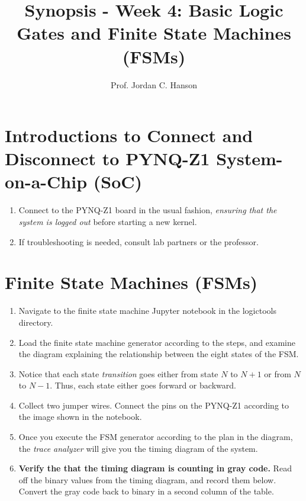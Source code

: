 \documentclass{article}
\begin{document}
\title{Synopsis - Week 4: Basic Logic Gates and Finite State Machines (FSMs)}
\author{Prof. Jordan C. Hanson}

\maketitle

\section{Introductions to Connect and Disconnect to PYNQ-Z1 System-on-a-Chip (SoC)}

\begin{enumerate}
\item Connect to the PYNQ-Z1 board in the usual fashion,\textit{ ensuring that the system is logged out} before starting a new kernel.
\item If troubleshooting is needed, consult lab partners or the professor.
\end{enumerate}

\section{Finite State Machines (FSMs)}

\begin{enumerate}
\item Navigate to the finite state machine Jupyter notebook in the logictools directory.
\item Load the finite state machine generator according to the steps, and examine the diagram explaining the relationship between the eight states of the FSM.
\item Notice that each state \textit{transition} goes either from state $N$ to $N+1$ or from $N$ to $N-1$.  Thus, each state either goes forward or backward.
\item Collect two jumper wires.  Connect the pins on the PYNQ-Z1 according to the image shown in the notebook.
\item Once you execute the FSM generator according to the plan in the diagram, the \textit{trace analyzer} will give you the timing diagram of the system.
\item \textbf{Verify the that the timing diagram is counting in gray code.}  Read off the binary values from the timing diagram, and record them below.  Convert the gray code back to binary in a second column of the table. \\ \vspace{2cm}
\end{enumerate}
\end{document}
